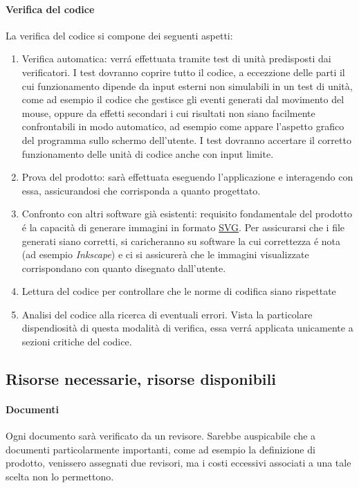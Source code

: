 \documentclass[a4paper]{article}
\begin{document}
\paragraph{Verifica del codice}
La verifica del codice si compone dei seguenti aspetti:
\begin{enumerate}
\item Verifica automatica: verr\'a effettuata tramite test di unit\`a predisposti dai verificatori. I test dovranno coprire tutto il codice, a eccezzione delle parti il cui funzionamento dipende da input esterni non simulabili in un test di unit\`a, come ad esempio il codice che gestisce gli eventi generati dal movimento del mouse, oppure da effetti secondari i cui risultati non siano facilmente confrontabili in modo automatico, ad esempio come appare l'aspetto grafico del programma sullo schermo dell'utente. I test dovranno accertare il corretto funzionamento delle unit\`a di codice anche con input limite.
\item Prova del prodotto: sar\`a effettuata eseguendo l'applicazione e interagendo con essa, assicurandosi che corrisponda a quanto progettato.
\item Confronto con altri software gi\`a esistenti: requisito fondamentale del prodotto \'e la capacit\`a di generare immagini in formato \underline{SVG}. Per assicurarsi che i file generati siano corretti, si caricheranno su software la cui correttezza \'e nota (ad esempio \textit{Inkscape}) e ci si assicurer\`a che le immagini visualizzate corrispondano con quanto disegnato dall'utente. 
\item Lettura del codice per controllare che le norme di codifica siano rispettate
\item Analisi del codice alla ricerca di eventuali errori. Vista la particolare dispendiosit\`a di questa modalit\`a di verifica, essa verr\'a applicata unicamente a sezioni critiche del codice.
\end{enumerate}


\subsection{Risorse necessarie, risorse disponibili}
\paragraph{Documenti} Ogni documento sar\`a verificato da un revisore. Sarebbe auspicabile che a documenti particolarmente importanti, come ad esempio la definizione di prodotto, venissero assegnati due revisori, ma i costi eccessivi associati a una tale scelta non lo permettono.
\end{document}
